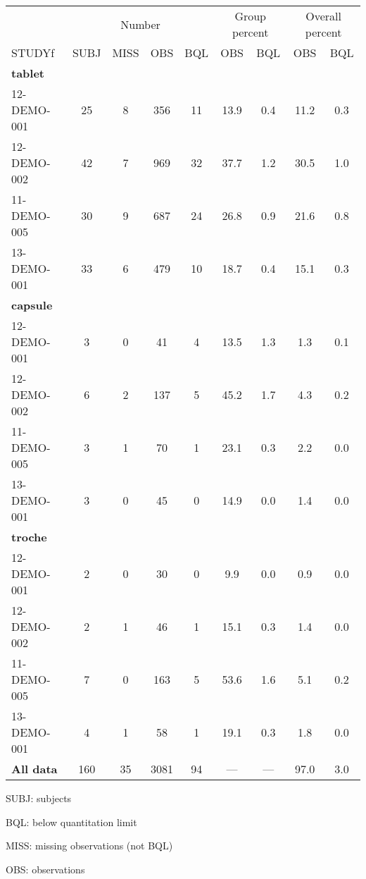 \setlength{\tabcolsep}{5pt} 
\begin{threeparttable}
\renewcommand{\arraystretch}{1.3}
\begin{tabular}[h]{lcccccccc}
\hline
\multicolumn{1}{c}{} & \multicolumn{4}{c}{Number} & \multicolumn{2}{c}{Group percent} & \multicolumn{2}{c}{Overall percent} \\
\cmidrule(lr){2-5}
\cmidrule(lr){6-7}
\cmidrule(lr){8-9}
STUDYf & SUBJ & MISS & OBS & BQL & OBS & BQL & OBS & BQL \\
\hline
\multicolumn{9}{l}{\textbf{tablet}}\\
12-DEMO-001 & 25 & 8 & 356 & 11 & 13.9 & 0.4 & 11.2 & 0.3 \\
12-DEMO-002 & 42 & 7 & 969 & 32 & 37.7 & 1.2 & 30.5 & 1.0 \\
11-DEMO-005 & 30 & 9 & 687 & 24 & 26.8 & 0.9 & 21.6 & 0.8 \\
13-DEMO-001 & 33 & 6 & 479 & 10 & 18.7 & 0.4 & 15.1 & 0.3 \\
\hline \multicolumn{9}{l}{\textbf{capsule}}\\
12-DEMO-001 & 3 & 0 & 41 & 4 & 13.5 & 1.3 & 1.3 & 0.1 \\
12-DEMO-002 & 6 & 2 & 137 & 5 & 45.2 & 1.7 & 4.3 & 0.2 \\
11-DEMO-005 & 3 & 1 & 70 & 1 & 23.1 & 0.3 & 2.2 & 0.0 \\
13-DEMO-001 & 3 & 0 & 45 & 0 & 14.9 & 0.0 & 1.4 & 0.0 \\
\hline \multicolumn{9}{l}{\textbf{troche}}\\
12-DEMO-001 & 2 & 0 & 30 & 0 & 9.9 & 0.0 & 0.9 & 0.0 \\
12-DEMO-002 & 2 & 1 & 46 & 1 & 15.1 & 0.3 & 1.4 & 0.0 \\
11-DEMO-005 & 7 & 0 & 163 & 5 & 53.6 & 1.6 & 5.1 & 0.2 \\
13-DEMO-001 & 4 & 1 & 58 & 1 & 19.1 & 0.3 & 1.8 & 0.0 \\
\hline \hline {\bf All data} & 160 & 35 & 3081 & 94 & --- & --- & 97.0 & 3.0 \\
\hline
\end{tabular}
\begin{tablenotes}[flushleft]
\item SUBJ: subjects
\item BQL: below quantitation limit
\item MISS: missing observations (not BQL)
\item OBS: observations
\end{tablenotes}
\end{threeparttable}
